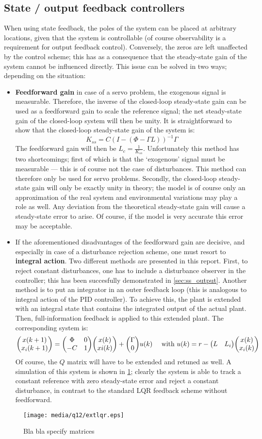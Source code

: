 \subsection*{State / output feedback controllers}
When using state feedback, the poles of the system can be placed at arbitrary locations, given that the system is controllable (of course observability is a requirement for output feedback control). Conversely, the zeros are left unaffected by the control scheme; this has as a consequence that the steady-state gain of the system cannot be influenced directly. This issue can be solved in two ways; depending on the situation:
\begin{itemize}
    \item \textbf{Feedforward gain} in case of a servo problem, the exogenous signal is measurable. Therefore, the inverse of the closed-loop steady-state gain can be used as a feedforward gain to scale the reference signal; the net steady-state gain of the closed-loop system will then be unity. It is straightforward to show that the closed-loop steady-state gain of the system is:
    $$ K_{ss} = C(I - (\Phi - \Gamma L))^{-1}\Gamma$$
    The feedforward gain will then be $L_c = \frac{1}{K_{ss}}$. Unfortunately this method has two shortcomings; first of which is that the `exogenous' signal must be measurable --- this is of course not the case of disturbances. This method can therefore only be used for servo problems. Secondly, the closed-loop steady-state gain will only be exactly unity in theory; the model is of course only an approximation of the real system and environmental variations may play a role as well. Any deviation from the theoretical steady-state gain will cause a steady-state error to arise. Of course, if the model is very accurate this error may be acceptable. \cite{keviczky}
    \item If the aforementioned disadvantages of the feedforward gain are decisive, and especially in case of a disturbance rejection scheme, one must resort to \textbf{integral action}. Two different methods are presented in this report. First, to reject constant disturbances, one has to include a disturbance observer in the controller; this has been succesfully demonstrated in \cref{sec:ss_output}. Another method is to put an integrator in an outer feedback loop (this is analogous to integral action of the PID controller). To achieve this, the plant is extended with an integral state that contains the integrated output of the actual plant. Then, full-information feedback is applied to this extended plant. The corresponding system is:
        $$ \mqty(x(k+1)\\x_i(k+1)) = \mqty(\Phi & 0 \\ -C & 1)\mqty(x(k)\\xi(k)) + \mqty(\Gamma\\0)u(k)\quad\text{ with }u(k) = r - \mqty(L & L_i)\mqty(x(k)\\x_i(k))$$ 
    Of course, the $Q$ matrix will have to be extended and retuned as well. A simulation of this system is shown in \cref{fig:q12_extlqr}; clearly the system is able to track a constant reference with zero steady-state error and reject a constant disturbance, in contrast to the standard LQR feedback scheme without feedforward.
\end{itemize}
\begin{figure}
    \centering
    \texttt{[image: media/q12/extlqr.eps]}
    \caption{Bla bla specify matrices}
    \label{fig:q12_extlqr}
\end{figure}